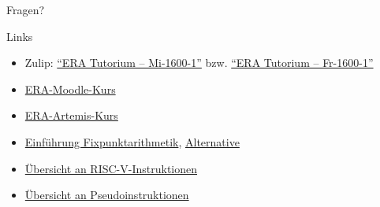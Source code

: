 \begin{frame}[c]{}{}
	\begin{center}
		\LARGE Fragen?
	\end{center}
\end{frame}


\begin{frame}[fragile, c]{Links}{}
	\begin{itemize}
		\item Zulip: \href{https://zulip.cit.tum.de/#narrow/channel/3254-ERA-Tutorium-.E2.80.93-Mi-1600-1}{\enquote{ERA Tutorium -- Mi-1600-1}}
		      bzw. \href{https://zulip.cit.tum.de/#narrow/channel/3266-ERA-Tutorium-.E2.80.93-Fr-1600-1}{\enquote{ERA Tutorium -- Fr-1600-1}}
		\item \href{https://www.moodle.tum.de/course/view.php?id=121343}{ERA-Moodle-Kurs}
		\item \href{https://artemis.tum.de/courses/596/exercises/21744}{ERA-Artemis-Kurs}
		\item \href{https://vanhunteradams.com/FixedPoint/FixedPoint.html}{Einführung Fixpunktarithmetik}, \href{https://specbranch.com/posts/fixed-point/}{Alternative}
		\item \href{https://msyksphinz-self.github.io/riscv-isadoc/html/index.html}{Übersicht an RISC-V-Instruktionen}
		\item \href{https://github.com/riscv-non-isa/riscv-asm-manual/blob/main/src/asm-manual.adoc#a-listing-of-standard-risc-v-pseudoinstructions}{Übersicht an Pseudoinstruktionen}
	\end{itemize}
\end{frame}

\maketitle


